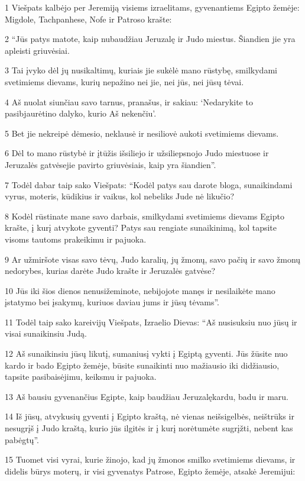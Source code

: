 \par 1 Viešpats kalbėjo per Jeremiją visiems izraelitams, gyvenantiems Egipto žemėje: Migdole, Tachpanhese, Nofe ir Patroso krašte: 
\par 2 “Jūs patys matote, kaip nubaudžiau Jeruzalę ir Judo miestus. Šiandien jie yra apleisti griuvėsiai. 
\par 3 Tai įvyko dėl jų nusikaltimų, kuriais jie sukėlė mano rūstybę, smilkydami svetimiems dievams, kurių nepažino nei jie, nei jūs, nei jūsų tėvai. 
\par 4 Aš nuolat siunčiau savo tarnus, pranašus, ir sakiau: ‘Nedarykite to pasibjaurėtino dalyko, kurio Aš nekenčiu’. 
\par 5 Bet jie nekreipė dėmesio, neklausė ir nesiliovė aukoti svetimiems dievams. 
\par 6 Dėl to mano rūstybė ir įtūžis išsiliejo ir užsiliepsnojo Judo miestuose ir Jeruzalės gatvėse­jie pavirto griuvėsiais, kaip yra šiandien”. 
\par 7 Todėl dabar taip sako Viešpats: “Kodėl patys sau darote bloga, sunaikindami vyrus, moteris, kūdikius ir vaikus, kol nebeliks Jude nė likučio? 
\par 8 Kodėl rūstinate mane savo darbais, smilkydami svetimiems dievams Egipto krašte, į kurį atvykote gyventi? Patys sau rengiate sunaikinimą, kol tapsite visoms tautoms prakeikimu ir pajuoka. 
\par 9 Ar užmiršote visas savo tėvų, Judo karalių, jų žmonų, savo pačių ir savo žmonų nedorybes, kurias darėte Judo krašte ir Jeruzalės gatvėse? 
\par 10 Jūs iki šios dienos nenusižeminote, nebijojote manęs ir nesilaikėte mano įstatymo bei įsakymų, kuriuos daviau jums ir jūsų tėvams”. 
\par 11 Todėl taip sako kareivijų Viešpats, Izraelio Dievas: “Aš nusisuksiu nuo jūsų ir visai sunaikinsiu Judą. 
\par 12 Aš sunaikinsiu jūsų likutį, sumaniusį vykti į Egiptą gyventi. Jūs žūsite nuo kardo ir bado Egipto žemėje, būsite sunaikinti nuo mažiausio iki didžiausio, tapsite pasibaisėjimu, keiksmu ir pajuoka. 
\par 13 Aš bausiu gyvenančius Egipte, kaip baudžiau Jeruzalę­kardu, badu ir maru. 
\par 14 Iš jūsų, atvykusių gyventi į Egipto kraštą, nė vienas neišsigelbės, neištrūks ir nesugrįš į Judo kraštą, kurio jūs ilgitės ir į kurį norėtumėte sugrįžti, nebent kas pabėgtų”. 
\par 15 Tuomet visi vyrai, kurie žinojo, kad jų žmonos smilko svetimiems dievams, ir didelis būrys moterų, ir visi gyvenatys Patrose, Egipto žemėje, atsakė Jeremijui: 
